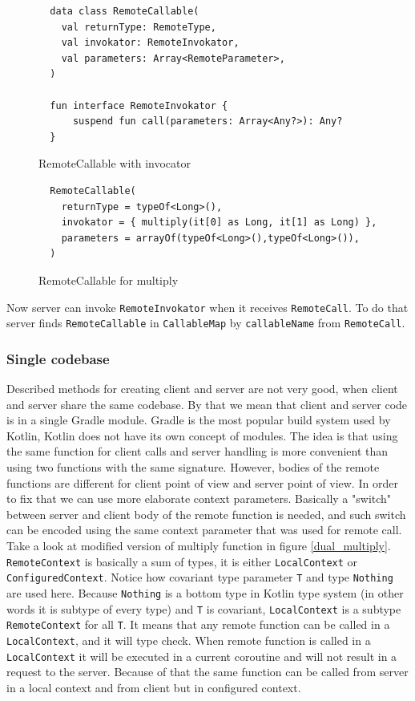 \documentclass[a4paper,11pt,oneside]{article}
\newcommand{\kotlini}[1]{\texttt{#1}}
\begin{document}
\begin{figure}[!h]
  \begin{verbatim}
  data class RemoteCallable(
    val returnType: RemoteType,
    val invokator: RemoteInvokator,
    val parameters: Array<RemoteParameter>,
  )

  fun interface RemoteInvokator {
      suspend fun call(parameters: Array<Any?>): Any?
  }
  \end{verbatim}
  \caption{RemoteCallable with invocator}\label{remote_callable_invokator}
\end{figure}

\begin{figure}[!h]
  \begin{verbatim}
  RemoteCallable(
    returnType = typeOf<Long>(),
    invokator = { multiply(it[0] as Long, it[1] as Long) },
    parameters = arrayOf(typeOf<Long>(),typeOf<Long>()),
  )
  \end{verbatim}
  \caption{RemoteCallable for multiply}\label{remote_callable_multiply}
\end{figure}

Now server can invoke \kotlini{RemoteInvokator} when it receives \kotlini{RemoteCall}. To do that
server finds \kotlini{RemoteCallable} in \kotlini{CallableMap} by \kotlini{callableName} from
\kotlini{RemoteCall}.

\subsubsection{Single codebase}

Described methods for creating client and server are not very good, when client and server share
the same codebase. By that we mean that client and server code is in a single Gradle module. Gradle
\cite{noauthor_gradle_2026} is the most popular build system used by Kotlin, Kotlin does not have
its own concept of modules. The idea is that using the same function for client calls and server handling
is more convenient than using two functions with the same signature. However, bodies of the remote functions
are different for client point of view and server point of view. In order to fix that we can use more
elaborate context parameters. Basically a "switch" between server and client body of the remote function 
is needed, and such switch can be encoded using the same context parameter that was used for remote call.
Take a look at modified version of multiply function in figure \ref{dual_multiply}. \kotlini{RemoteContext}
is basically a sum of types, it is either \kotlini{LocalContext} or \kotlini{ConfiguredContext}.
Notice how covariant type parameter \kotlini{T} and type \kotlini{Nothing} are used here. Because 
\kotlini{Nothing} is a bottom type in Kotlin type system (in other words it is subtype of every type)
and \kotlini{T} is covariant, \kotlini{LocalContext} is a subtype \kotlini{RemoteContext} for all \kotlini{T}.
It means that any remote function can be called in a \kotlini{LocalContext}, and it will type check.
When remote function is called in a \kotlini{LocalContext} it will be executed in a current coroutine and will not
result in a request to the server. Because of that the same function can be called from server in a 
local context and from client but in configured context.
\end{document}
